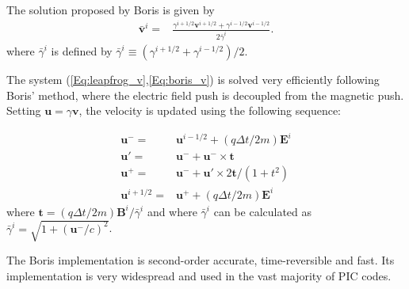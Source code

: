 

The solution proposed by Boris \cite{BorisICNSP70} is given by 
\begin{align}
\mathbf{\bar{v}}^{i}= & \frac{\gamma^{i+1/2}\mathbf{v}^{i+1/2}+\gamma^{i-1/2}\mathbf{v}^{i-1/2}}{2\bar{\gamma}^{i}}.\label{Eq:boris_v}
\end{align}
where $\bar{\gamma}^{i}$ is defined by $\bar{\gamma}^{i} \equiv (\gamma^{i+1/2}+\gamma^{i-1/2} )/2$.

The system (\ref{Eq:leapfrog_v},\ref{Eq:boris_v}) is solved very
efficiently following Boris' method, where the electric field push
is decoupled from the magnetic push. Setting $\mathbf{u}=\gamma\mathbf{v}$, the
velocity is updated using the following sequence:

\begin{subequations}
\begin{align}
\mathbf{u^{-}}= & \mathbf{u}^{i-1/2}+\left(q\Delta t/2m\right)\mathbf{E}^{i}\\
\mathbf{u'}= & \mathbf{u}^{-}+\mathbf{u}^{-}\times\mathbf{t}\\
\mathbf{u}^{+}= & \mathbf{u}^{-}+\mathbf{u'}\times2\mathbf{t}/(1+t^{2})\\
\mathbf{u}^{i+1/2}= & \mathbf{u}^{+}+\left(q\Delta t/2m\right)\mathbf{E}^{i}
\end{align}
\end{subequations}
where $\mathbf{t}=\left(q\Delta
  t/2m\right)\mathbf{B}^{i}/\bar{\gamma}^{i}$ and where
$\bar{\gamma}^{i}$ can be calculated as $\bar{\gamma}^{i}=\sqrt{1+(\mathbf{u}^-/c)^2}$. 

The Boris implementation is second-order accurate, time-reversible and fast. Its implementation is very widespread and used in the vast majority of PIC codes.
